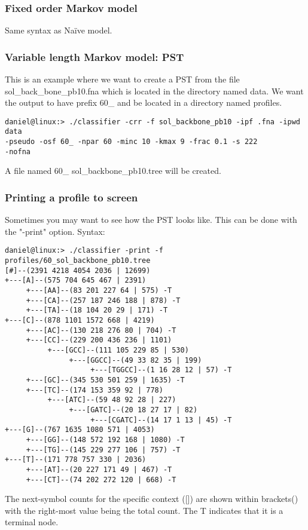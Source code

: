 \documentclass[]{article}
\begin{document}
\subsubsection{Fixed order Markov model}
Same syntax as Na\"ive model.
\subsubsection{Variable length Markov model: PST}
This is an example where we want to create a PST from the file
sol\_back\_bone\_pb10.fna which is located in the directory named data. We
want the output to have prefix 60\_ and be located in a directory named profiles. 
\begin{verbatim}
daniel@linux:> ./classifier -crr -f sol_backbone_pb10 -ipf .fna -ipwd data
-pseudo -osf 60_ -npar 60 -minc 10 -kmax 9 -frac 0.1 -s 222
-nofna
\end{verbatim}
A file named 60\_ sol\_backbone\_pb10.tree will be created. 
\subsubsection{Printing a profile to screen}
Sometimes you may want to see how the PST looks like. This can be done with
the "-print" option. Syntax:
\begin{verbatim}
daniel@linux:> ./classifier -print -f profiles/60_sol_backbone_pb10.tree
[#]--(2391 4218 4054 2036 | 12699)
+---[A]--(575 704 645 467 | 2391)
     +---[AA]--(83 201 227 64 | 575) -T
     +---[CA]--(257 187 246 188 | 878) -T
     +---[TA]--(18 104 20 29 | 171) -T
+---[C]--(878 1101 1572 668 | 4219)
     +---[AC]--(130 218 276 80 | 704) -T
     +---[CC]--(229 200 436 236 | 1101)
          +---[GCC]--(111 105 229 85 | 530)
               +---[GGCC]--(49 33 82 35 | 199)
                    +---[TGGCC]--(1 16 28 12 | 57) -T
     +---[GC]--(345 530 501 259 | 1635) -T
     +---[TC]--(174 153 359 92 | 778)
          +---[ATC]--(59 48 92 28 | 227)
               +---[GATC]--(20 18 27 17 | 82)
                    +---[CGATC]--(14 17 1 13 | 45) -T
+---[G]--(767 1635 1080 571 | 4053)
     +---[GG]--(148 572 192 168 | 1080) -T
     +---[TG]--(145 229 277 106 | 757) -T
+---[T]--(171 778 757 330 | 2036)
     +---[AT]--(20 227 171 49 | 467) -T
     +---[CT]--(74 202 272 120 | 668) -T
\end{verbatim}
The next-symbol counts for the specific context ([]) are shown within
brackets() with the right-most value being the total count. The T
indicates that it is a terminal node. 
\end{document}
